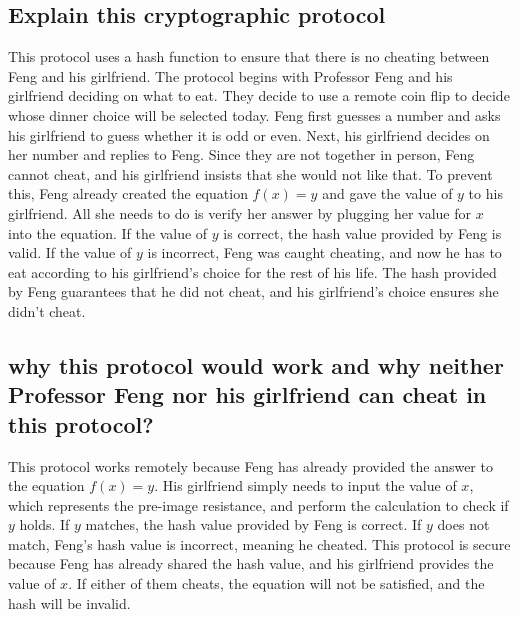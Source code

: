 \documentclass{article}
\begin{document}
\subsection{Explain this cryptographic protocol}

This protocol uses a hash function to ensure that there is no cheating between Feng and his girlfriend. The protocol begins with Professor Feng and his girlfriend deciding on what to eat. They decide to use a remote coin flip to decide whose dinner choice will be selected today. Feng first guesses a number and asks his girlfriend to guess whether it is odd or even. Next, his girlfriend decides on her number and replies to Feng. Since they are not together in person, Feng cannot cheat, and his girlfriend insists that she would not like that. To prevent this, Feng already created the equation \(f(x) = y\) and gave the value of \(y\) to his girlfriend. All she needs to do is verify her answer by plugging her value for \(x\) into the equation. If the value of \(y\) is correct, the hash value provided by Feng is valid. If the value of \(y\) is incorrect, Feng was caught cheating, and now he has to eat according to his girlfriend's choice for the rest of his life. The hash provided by Feng guarantees that he did not cheat, and his girlfriend’s choice ensures she didn’t cheat.

\subsection{ why this protocol would work and why neither Professor Feng nor his girlfriend can cheat in this protocol?}

This protocol works remotely because Feng has already provided the answer to the equation \(f(x) = y\). His girlfriend simply needs to input the value of \(x\), which represents the pre-image resistance, and perform the calculation to check if \(y\) holds. If \(y\) matches, the hash value provided by Feng is correct. If \(y\) does not match, Feng’s hash value is incorrect, meaning he cheated. This protocol is secure because Feng has already shared the hash value, and his girlfriend provides the value of \(x\). If either of them cheats, the equation will not be satisfied, and the hash will be invalid.
\end{document}
